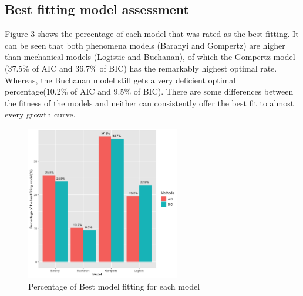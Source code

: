 \documentclass[11pt]{article}
\begin{document}
\subsection{Best fitting model assessment}
Figure 3 shows the percentage of each model that was rated as the best fitting. It can be seen that both phenomena models (Baranyi and Gompertz) are higher than mechanical models (Logistic and Buchanan), of which the Gompertz model (37.5\% of AIC and 36.7\% of BIC) has the remarkably highest optimal rate. Whereas, the Buchanan model still gets a very deficient optimal percentage(10.2\% of AIC and 9.5\% of BIC). There are some differences between the fitness of the models and neither can consistently offer the best fit to almost every growth curve.
\begin{figure}[h]
\centering
\includegraphics[width = 0.6\textwidth]{../Results/Bestfitting.png}
        \caption{Percentage of Best model fitting for each model}
	    \end{figure}
\end{document}
